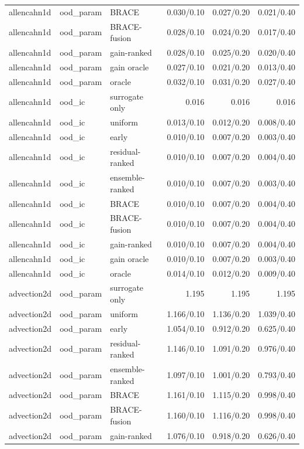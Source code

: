 \begin{tabular}{lllrrr}
allencahn1d & ood\_param & BRACE & 0.030/0.10 & 0.027/0.20 & 0.021/0.40 \\
allencahn1d & ood\_param & BRACE-fusion & 0.028/0.10 & 0.024/0.20 & 0.017/0.40 \\
allencahn1d & ood\_param & gain-ranked & 0.028/0.10 & 0.025/0.20 & 0.020/0.40 \\
allencahn1d & ood\_param & gain oracle & 0.027/0.10 & 0.021/0.20 & 0.013/0.40 \\
allencahn1d & ood\_param & oracle & 0.032/0.10 & 0.031/0.20 & 0.027/0.40 \\
\midrule
allencahn1d & ood\_ic & surrogate only & 0.016 & 0.016 & 0.016 \\
allencahn1d & ood\_ic & uniform & 0.013/0.10 & 0.012/0.20 & 0.008/0.40 \\
allencahn1d & ood\_ic & early & 0.010/0.10 & 0.007/0.20 & 0.003/0.40 \\
allencahn1d & ood\_ic & residual-ranked & 0.010/0.10 & 0.007/0.20 & 0.004/0.40 \\
allencahn1d & ood\_ic & ensemble-ranked & 0.010/0.10 & 0.007/0.20 & 0.003/0.40 \\
allencahn1d & ood\_ic & BRACE & 0.010/0.10 & 0.007/0.20 & 0.004/0.40 \\
allencahn1d & ood\_ic & BRACE-fusion & 0.010/0.10 & 0.007/0.20 & 0.004/0.40 \\
allencahn1d & ood\_ic & gain-ranked & 0.010/0.10 & 0.007/0.20 & 0.004/0.40 \\
allencahn1d & ood\_ic & gain oracle & 0.010/0.10 & 0.007/0.20 & 0.003/0.40 \\
allencahn1d & ood\_ic & oracle & 0.014/0.10 & 0.012/0.20 & 0.009/0.40 \\
\midrule
advection2d & ood\_param & surrogate only & 1.195 & 1.195 & 1.195 \\
advection2d & ood\_param & uniform & 1.166/0.10 & 1.136/0.20 & 1.039/0.40 \\
advection2d & ood\_param & early & 1.054/0.10 & 0.912/0.20 & 0.625/0.40 \\
advection2d & ood\_param & residual-ranked & 1.146/0.10 & 1.091/0.20 & 0.976/0.40 \\
advection2d & ood\_param & ensemble-ranked & 1.097/0.10 & 1.001/0.20 & 0.793/0.40 \\
advection2d & ood\_param & BRACE & 1.161/0.10 & 1.115/0.20 & 0.998/0.40 \\
advection2d & ood\_param & BRACE-fusion & 1.160/0.10 & 1.116/0.20 & 0.998/0.40 \\
advection2d & ood\_param & gain-ranked & 1.076/0.10 & 0.918/0.20 & 0.626/0.40 \\

\end{tabular}
